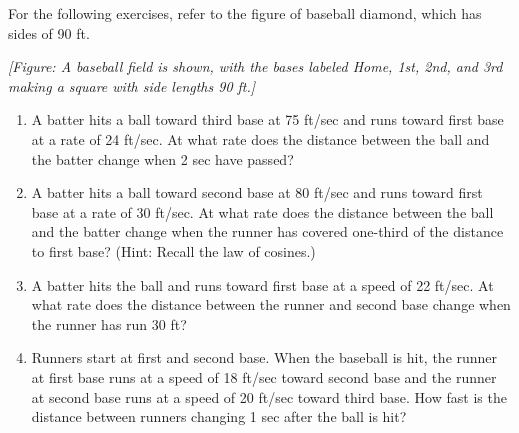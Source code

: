 \documentclass{exercises}
\begin{document}
For the following exercises, refer to the figure of baseball diamond, which has sides of 90 ft.


\textit{[Figure: A baseball field is shown, with the bases labeled Home, 1st, 2nd, and 3rd making a square with side lengths 90 ft.]}

\begin{enumerate}[resume]
\item \techrequired A batter hits a ball toward third base at 75 ft/sec and runs toward first base at a rate of 24 ft/sec. At what rate does the distance between the ball and the batter change when 2 sec have passed?
\item \techrequired A batter hits a ball toward second base at 80 ft/sec and runs toward first base at a rate of 30 ft/sec. At what rate does the distance between the ball and the batter change when the runner has covered one-third of the distance to first base? (Hint: Recall the law of cosines.)
\item \techrequired A batter hits the ball and runs toward first base at a speed of 22 ft/sec. At what rate does the distance between the runner and second base change when the runner has run 30 ft?
\item \techrequired Runners start at first and second base. When the baseball is hit, the runner at first base runs at a speed of 18 ft/sec toward second base and the runner at second base runs at a speed of 20 ft/sec toward third base. How fast is the distance between runners changing 1 sec after the ball is hit?
\end{enumerate}
\end{document}
